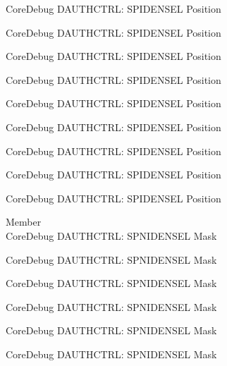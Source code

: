 \begin{DoxyRefList}
\label{deprecated__deprecated000644}%
%
Core\+Debug DAUTHCTRL\+: SPIDENSEL Position 

\label{deprecated__deprecated000750}%
%
Core\+Debug DAUTHCTRL\+: SPIDENSEL Position 

\label{deprecated__deprecated000804}%
%
Core\+Debug DAUTHCTRL\+: SPIDENSEL Position 

\label{deprecated__deprecated000880}%
%
Core\+Debug DAUTHCTRL\+: SPIDENSEL Position 

\label{deprecated__deprecated000943}%
%
Core\+Debug DAUTHCTRL\+: SPIDENSEL Position 

\label{deprecated__deprecated001022}%
%
Core\+Debug DAUTHCTRL\+: SPIDENSEL Position 

\label{deprecated__deprecated001098}%
%
Core\+Debug DAUTHCTRL\+: SPIDENSEL Position 

\label{deprecated__deprecated001201}%
%
Core\+Debug DAUTHCTRL\+: SPIDENSEL Position 

\label{deprecated__deprecated001303}%
%
Core\+Debug DAUTHCTRL\+: SPIDENSEL Position  
\item[Member \doxylink{group___c_m_s_i_s___s_c_b_gaabb5d6c750c9ec50254134ece2111dcd}{Core\+Debug\+\_\+\+DAUTHCTRL\+\_\+\+SPNIDENSEL\+\_\+\+Msk} ]\hfill \\
\label{deprecated__deprecated000088}%
%
Core\+Debug DAUTHCTRL\+: SPNIDENSEL Mask 

\label{deprecated__deprecated000142}%
%
Core\+Debug DAUTHCTRL\+: SPNIDENSEL Mask 

\label{deprecated__deprecated000218}%
%
Core\+Debug DAUTHCTRL\+: SPNIDENSEL Mask 

\label{deprecated__deprecated000281}%
%
Core\+Debug DAUTHCTRL\+: SPNIDENSEL Mask 

\label{deprecated__deprecated000360}%
%
Core\+Debug DAUTHCTRL\+: SPNIDENSEL Mask 

\label{deprecated__deprecated000436}%
%
Core\+Debug DAUTHCTRL\+: SPNIDENSEL Mask 


\end{DoxyRefList}

